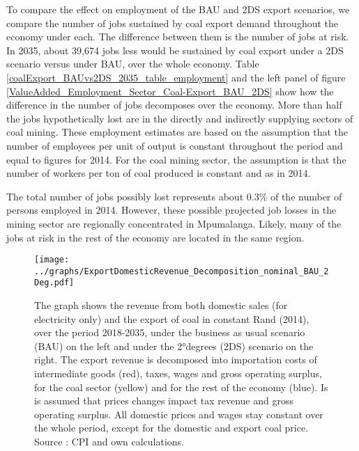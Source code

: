 \documentclass[12pt,english]{article}
\begin{document}
To compare the effect on employment of the BAU and 2DS export scenarios, we compare the number of jobs sustained by coal export demand throughout the economy under each. The difference between them is the number of jobs at risk.
In 2035, about 39,674 jobs less would be sustained by coal export under a 2DS scenario versus under BAU, over the whole economy. Table \ref{coalExport_BAUvs2DS_2035_table_employment} and the left panel of figure \ref{ValueAdded_Employment_Sector_Coal-Export_BAU_2DS} show how the difference in the number of jobs decomposes over the economy. More than half the jobs hypothetically lost are in the directly and indirectly supplying sectors of coal mining. These employment estimates are based on the assumption that the number of employees per unit of output is constant throughout the period and equal to figures for 2014. For the coal mining sector, the assumption is that the number of workers per ton of coal produced is constant and as in 2014. 

The total number of jobs possibly lost represents about 0.3\% of the number of persons employed in 2014. However, these possible projected job losses in the mining sector are regionally concentrated in Mpumalanga. Likely, many of the jobs at risk in the rest of the economy are located in the same region.

\begin{figure}[!t]
	\hspace{-10pt}\texttt{[image: ../graphs/ExportDomesticRevenue\_Decomposition\_nominal\_BAU\_2Deg.pdf]}
	\caption{\label{ExportDomesticRevenue_Decomposition_BAU_2DS}\small The graph shows the revenue from both domestic sales (for electricity only) and the export of coal in constant Rand (2014), over the period 2018-2035, under the business as usual scenario (BAU) on the left and under the 2°degrees (2DS) scenario on the right. The export revenue is decomposed into importation costs of intermediate goods (red), taxes, wages and gross operating surplus, for the coal sector (yellow) and for the rest of the economy (blue). Is is assumed that prices changes impact tax revenue and gross operating surplus. All domestic prices and wages stay constant over the whole period, except for the domestic and export coal price. Source : CPI and own calculations. }
\end{figure}
\end{document}
